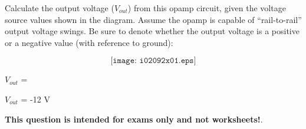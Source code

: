 

Calculate the output voltage ($V_{out}$) from this opamp circuit, given the voltage source values shown in the diagram.  Assume the opamp is capable of ``rail-to-rail'' output voltage swings.  Be sure to denote whether the output voltage is a positive or a negative value (with reference to ground):

$$\texttt{[image: i02092x01.eps]}$$

$V_{out}$ = 







$V_{out}$ = -12 V







{\bf This question is intended for exams only and not worksheets!}.


